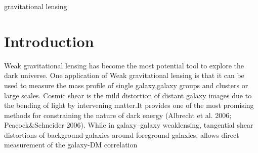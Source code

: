 \documentclass[useAMS,usenatbib]{mn2e}
\begin{document}
\begin{keywords}
  gravitational lensing
\end{keywords}

\setcounter{footnote}{1}




\section{Introduction}

\label{sec:intro}










Weak gravitational lensing has become the most potential tool to explore
the dark universe. One application of Weak gravitational lensing is
that it can be used to measure the mass profile of single galaxy,galaxy
groups and clusters or large scales. Cosmic shear is the mild distortion
of distant galaxy images due to the bending of light by intervening
matter.It provides one of the most promising methods for constraining
the nature of dark energy (Albrecht et al. 2006; Peacock\&Schneider
2006). While in galaxy--galaxy weaklensing, tangential shear distortions
of background galaxies around foreground galaxies, allows direct measurement
of the galaxy-DM correlation
\end{document}
